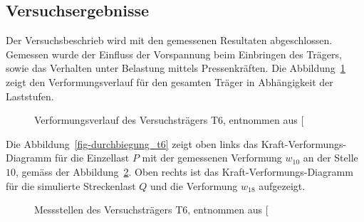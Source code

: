 \documentclass[
  11pt,
  letterpaper,
]{scrreprt}
\begin{document}
\subsection{Versuchsergebnisse}\label{versuchsergebnisse-2}

Der Versuchsbeschrieb wird mit den gemessenen Resultaten abgeschlossen.
Gemessen wurde der Einfluss der Vorspannung beim Einbringen des Trägers,
sowie das Verhalten unter Belastung mittels Pressenkräften. Die
Abbildung~\ref{fig-durchbiegung_laengs_t6} zeigt den Verformungsverlauf
für den gesamten Träger in Abhängigkeit der Laststufen.

\begin{figure}[H]


\caption{\label{fig-durchbiegung_laengs_t6}Verformungsverlauf des
Versuchsträgers T6, entnommen aus
{[}\citeproc{ref-sigrist_versuche_1993}{5}{]}}

\end{figure}%

Die Abbildung~\ref{fig-durchbiegung_t6} zeigt oben links das
Kraft-Verformungs-Diagramm für die Einzellast \(P\) mit der gemessenen
Verformung \(w_{10}\) an der Stelle \(10\), gemäss der
Abbildung~\ref{fig-messstellen_t6}. Oben rechts ist das
Kraft-Verformungs-Diagramm für die simulierte Streckenlast \(Q\) und die
Verformung \(w_{18}\) aufgezeigt.

\begin{figure}[H]


\caption{\label{fig-messstellen_t6}Messstellen des Versuchsträgers T6,
entnommen aus {[}\citeproc{ref-sigrist_versuche_1993}{5}{]}}

\end{figure}%
\end{document}
